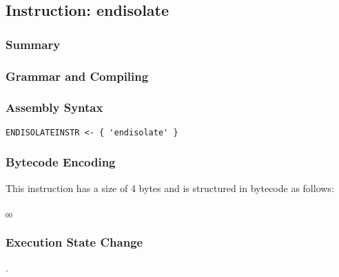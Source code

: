 \subsection{Instruction: endisolate}

\subsubsection{Summary}


\subsubsection{Grammar and Compiling}


\subsubsection{Assembly Syntax}

\begin{myquote}
\begin{verbatim}
ENDISOLATEINSTR <- { 'endisolate' }
\end{verbatim}
\end{myquote}


\subsubsection{Bytecode Encoding}

This instruction has a size of 4 bytes and is structured in bytecode as follows:

$_{00}$\ 


\subsubsection{Execution State Change}

.


